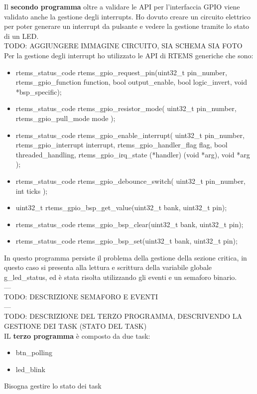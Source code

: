 \documentclass[12pt, a4paper, titlepage, oneside]{book}
\begin{document}
\begin{flushleft}
\begin{itemize}
\end{itemize}
Il \textbf{secondo programma} oltre a validare le API per l'interfaccia GPIO viene validato anche la gestione degli interrupts. Ho dovuto creare un circuito elettrico per poter generare un interrupt da pulsante e vedere la gestione tramite lo stato di un LED.\\
TODO: AGGIUNGERE IMMAGINE CIRCUITO, SIA SCHEMA SIA FOTO\\
Per la gestione degli interrupt ho utilizzato le API di RTEMS generiche che sono:
\begin{itemize}
    \item rtems\_status\_code rtems\_gpio\_request\_pin(uint32\_t pin\_number, rtems\_gpio\_function function, bool output\_enable, bool logic\_invert, void *bsp\_specific);
    \item rtems\_status\_code rtems\_gpio\_resistor\_mode(
  uint32\_t pin\_number,
  rtems\_gpio\_pull\_mode mode
);
\item rtems\_status\_code rtems\_gpio\_enable\_interrupt(
  uint32\_t pin\_number,
  rtems\_gpio\_interrupt interrupt,
  rtems\_gpio\_handler\_flag flag,
  bool threaded\_handling,
  rtems\_gpio\_irq\_state (*handler) (void *arg),
  void *arg
);
\item rtems\_status\_code rtems\_gpio\_debounce\_switch(
  uint32\_t pin\_number,
  int ticks
);
\item uint32\_t rtems\_gpio\_bsp\_get\_value(uint32\_t bank, uint32\_t pin);
\item rtems\_status\_code rtems\_gpio\_bsp\_clear(uint32\_t bank, uint32\_t pin);
\item rtems\_status\_code rtems\_gpio\_bsp\_set(uint32\_t bank, uint32\_t pin);
\end{itemize}
In questo programma persiste il problema della gestione della sezione critica, in questo caso si presenta alla lettura e scrittura della variabile globale g\_led\_status, ed è stata risolta utilizzando gli eventi e un semaforo binario.\\
---\\
TODO: DESCRIZIONE SEMAFORO E EVENTI\\

---\\
TODO: DESCRIZIONE DEL TERZO PROGRAMMA, DESCRIVENDO LA GESTIONE DEI TASK (STATO DEL TASK) \\
IL \textbf{terzo programma} è composto da due task:
\begin{itemize}
    \item btn\_polling
    \item led\_blink 
\end{itemize}
Bisogna gestire lo stato dei task


\end{flushleft}
\end{document}
